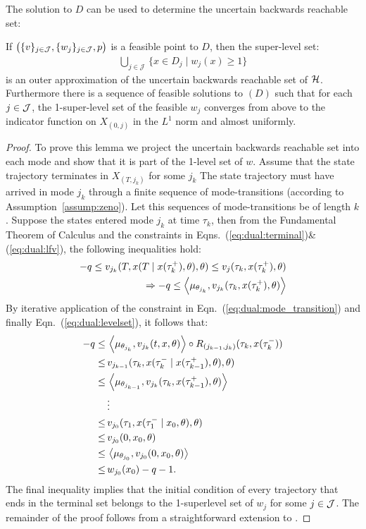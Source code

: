 The solution to $D$ can be used to determine the uncertain backwards reachable set:
\begin{lemma}
If $\big(\{v\}_{j \in {\cal J}},\{w_j\}_{j \in {\cal J}},p\big)$ is a feasible point to $D$, then the super-level set:
\begin{align}
	\bigcup_{j\in \mathcal J}\,\{x \in D_j \mid w_j(x)\ge 1\}
\end{align}
is an outer approximation of the uncertain backwards reachable set of ${\cal H}$.
Furthermore there is a sequence of feasible solutions to $(D)$ such that for each $j \in {\cal J}$, the 1-super-level set of the feasible $w_j$ converges from above to the indicator function on $X_{(0,j)}$ in the $L^1$ norm and almost uniformly.
\end{lemma}

\begin{proof}
To prove this lemma we project the uncertain backwards reachable set into each mode and show that it is part of the 1-level set of $w$.
Assume that the state trajectory terminates in $X_{(T,j_k)}$ for some $j_k$
The state trajectory must have arrived in mode $j_k$ through a finite sequence of mode-transitions (according to Assumption~\ref{assump:zeno}). 
Let this sequences of mode-transitions be of length $k$. 
Suppose the states entered mode $j_k$ at time $\tau_k$, then from the Fundamental Theorem of Calculus and the constraints in Eqns.~(\ref{eq:dual:terminal})\&(\ref{eq:dual:lfv}), the following inequalities hold:
\begin{align}
	-q\le v_{j_k}(T,x(T\mid x(\tau_k^+),\theta),\theta)\le v_j(\tau_k,x(\tau_k^+),\theta)\\
	\Rightarrow -q\le \left\langle \mu_{\theta_{j_k}},v_{j_k}(\tau_k,x(\tau_k^+),\theta)\right\rangle
\end{align}
By iterative application of the constraint in Eqn.~(\ref{eq:dual:mode_transition}) and finally Eqn.~(\ref{eq:dual:levelset}), it follows that:
\begin{align}
	-q\le&\, \left\langle \mu_{\theta_{j_k}},v_{j_k}(t,x,\theta)\right\rangle\circ R_{(j_{k-1},j_{k})}(\tau_{k},x(\tau_{k}^-))\\
      \le&\, v_{j_{k-1}}(\tau_{k},x(\tau_{k}^-\mid x(\tau_{k-1}^+),\theta),\theta)\\
      \le &\, \left\langle \mu_{\theta_{j_{k-1}}},v_{j_k}(\tau_k,x(\tau_{k-1}^+),\theta)\right\rangle\\\nonumber
      &\,\vdots\\
      \le &\,v_{j_0}(\tau_1,x(\tau_1^-\mid x_0,\theta),\theta)\\
      \le &\,v_{j_0}(0,x_0,\theta)\\
      \le &\,\left\langle \mu_{\theta_{j_0}},v_{j_0}(0,x_0,\theta)\right\rangle\\
      \le &\, w_{j_0}(x_0)-q-1.
\end{align}
The final inequality implies that the initial condition of every trajectory that ends in the terminal set belongs to the 1-superlevel set of $w_j$ for some $j \in {\cal J}$.
The remainder of the proof follows from a straightforward extension to \cite[Theorem 2]{henrion2014convex}.
\end{proof}

